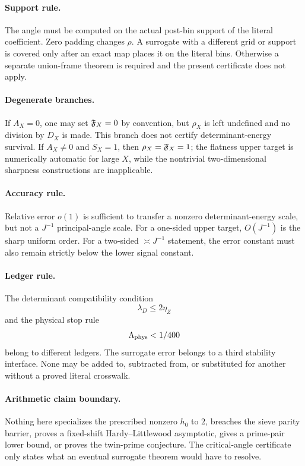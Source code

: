 \paragraph{Support rule.}
The angle must be computed on the actual post-bin support of the
literal coefficient.  Zero padding changes \(\rho\).  A surrogate
with a different grid or support is covered only after an exact map
places it on the literal bins.  Otherwise a separate union-frame
theorem is required and the present certificate does not apply.

\paragraph{Degenerate branches.}
If \(A_X=0\), one may set \(\mathfrak F_X=0\) by convention, but
\(\rho_X\) is left undefined and no division by \(D_X\) is made.
This branch does not certify determinant-energy survival.  If
\(A_X\ne0\) and \(S_X=1\), then
\(\rho_X=\mathfrak F_X=1\); the flatness upper target is numerically
automatic for large \(X\), while the nontrivial two-dimensional
sharpness constructions are inapplicable.

\paragraph{Accuracy rule.}
Relative error \(o(1)\) is sufficient to transfer a nonzero
determinant-energy scale, but not a \(J^{-1}\) principal-angle
scale.  For a one-sided upper target, \(O(J^{-1})\) is the sharp
uniform order.  For a two-sided \(\asymp J^{-1}\) statement, the
error constant must also remain strictly below the lower signal
constant.

\paragraph{Ledger rule.}
The determinant compatibility condition
\[
 \lambda_D\le2\eta_Z
\]
and the physical stop rule
\[
 \Lambda_{\rm phys}<1/400
\]
belong to different ledgers.  The surrogate error belongs to a
third stability interface.  None may be added to, subtracted from,
or substituted for another without a proved literal crosswalk.

\paragraph{Arithmetic claim boundary.}
Nothing here specializes the prescribed nonzero \(h_0\) to \(2\),
breaches the sieve parity barrier, proves a fixed-shift
Hardy--Littlewood asymptotic, gives a prime-pair lower bound, or
proves the twin-prime conjecture.  The critical-angle certificate
only states what an eventual surrogate theorem would have to
resolve.

